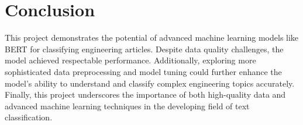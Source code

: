 \documentclass[../main.tex]{subfiles}
\begin{document}
\chapter{Conclusion}
This project demonstrates the potential of advanced machine learning models like BERT for classifying engineering articles. 
Despite data quality challenges, the model achieved respectable performance. 
Additionally, exploring more sophisticated data preprocessing
and model tuning could further enhance the model's ability to understand and classify complex engineering topics accurately. 
Finally, this project underscores the importance of both high-quality data 
and advanced machine learning techniques in the developing field of text classification.
\end{document}
